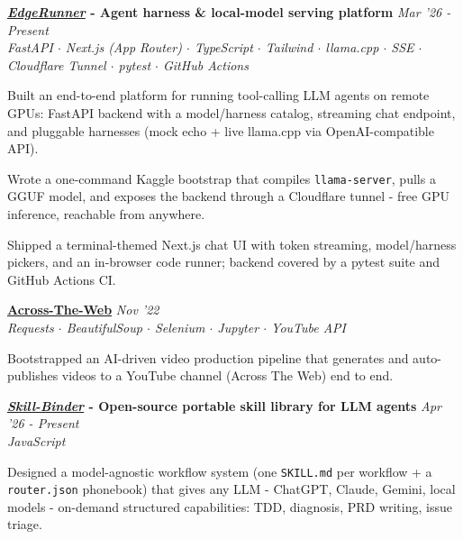 \documentclass[10pt,letterpaper]{article}
\newcommand{\entryheader}[3]{%
    \textbf{#1} \hfill \textit{#2}\\[0pt]
    \textit{\small #3}\\[1pt]
}
\begin{document}
\vspace{5pt}
\entryheader{\href{https://github.com/deveshpat/EdgeRunner}{\textit{EdgeRunner}} - Agent harness \& local-model serving platform}{Mar '26 - Present}
{\textit{\small FastAPI $\cdot$ Next.js (App Router) $\cdot$ TypeScript $\cdot$ Tailwind $\cdot$ llama.cpp $\cdot$ SSE $\cdot$ Cloudflare Tunnel $\cdot$ pytest $\cdot$ GitHub Actions}}
\vspace{-10pt}
\begin{tightitemize}
    \item Built an end-to-end platform for running tool-calling LLM agents on remote GPUs: FastAPI backend with a model/harness catalog, streaming chat endpoint, and pluggable harnesses (mock echo + live llama.cpp via OpenAI-compatible API).
    \item Wrote a one-command Kaggle bootstrap that compiles \texttt{llama-server}, pulls a GGUF model, and exposes the backend through a Cloudflare tunnel - free GPU inference, reachable from anywhere.
    \item Shipped a terminal-themed Next.js chat UI with token streaming, model/harness pickers, and an in-browser code runner; backend covered by a pytest suite and GitHub Actions CI.
\end{tightitemize}

\vspace{5pt}
\entryheader{\href{https://github.com/deveshpat/Across-The-Web}{Across-The-Web}}{Nov '22}
{\textit{\small Requests $\cdot$ BeautifulSoup $\cdot$ Selenium $\cdot$ Jupyter $\cdot$ YouTube API}}
\vspace{-10pt}
\begin{tightitemize}
    \item Bootstrapped an AI-driven video production pipeline that generates and auto-publishes videos to a YouTube channel (Across The Web) end to end.
\end{tightitemize}

\vspace{5pt}
\entryheader{\href{https://github.com/deveshpat/Skill-Binder}{\textit{Skill-Binder}} - Open-source portable skill library for LLM agents}
{Apr '26 - Present}
{JavaScript}
\vspace{-10pt}
\begin{tightitemize}
    \item Designed a model-agnostic workflow system (one \texttt{SKILL.md} per workflow + a \texttt{router.json} phonebook) that gives any LLM - ChatGPT, Claude, Gemini, local models - on-demand structured capabilities: TDD, diagnosis, PRD writing, issue triage.
\end{tightitemize}
\end{document}
